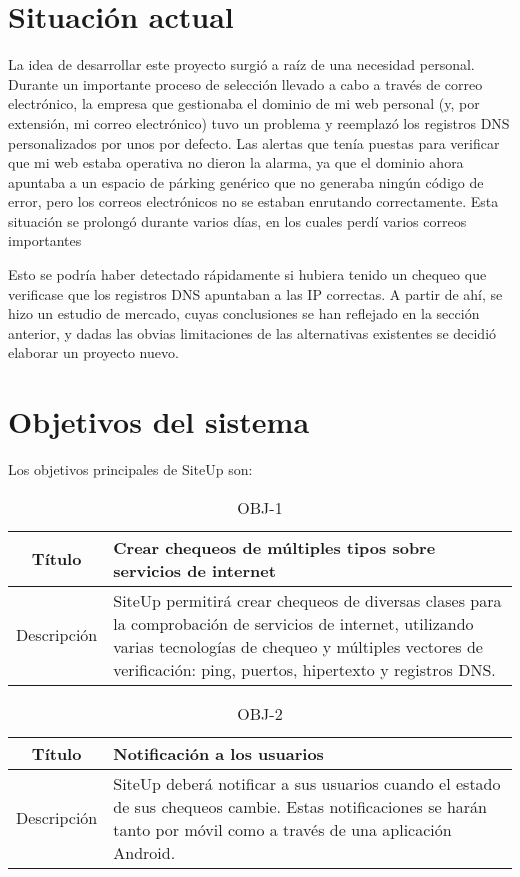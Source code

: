 \section{Situación actual}

La idea de desarrollar este proyecto surgió a raíz de una necesidad
personal. Durante un importante proceso de selección llevado a cabo a través de
correo electrónico, la empresa que gestionaba el dominio de mi web personal (y,
por extensión, mi correo electrónico) tuvo un problema y reemplazó los registros
DNS personalizados por unos por defecto. Las alertas que tenía puestas para
verificar que mi web estaba operativa no dieron la alarma, ya que el dominio
ahora apuntaba a un espacio de párking genérico que no generaba ningún código de
error, pero los correos electrónicos no se estaban enrutando correctamente. Esta
situación se prolongó durante varios días, en los cuales perdí varios correos
importantes

Esto se podría haber detectado rápidamente si hubiera tenido un chequeo que
verificase que los registros DNS apuntaban a las IP correctas. A partir de ahí,
se hizo un estudio de mercado, cuyas conclusiones se han reflejado en la sección
anterior, y dadas las obvias limitaciones de las alternativas existentes se
decidió elaborar un proyecto nuevo.

\section{Objetivos del sistema}

Los objetivos principales de SiteUp son:

\begin{table}[h!]
  \centering
  \begin{tabularx}{\textwidth}{|c|X|}
    \hline
    Título & Crear chequeos de múltiples tipos sobre servicios de internet \\

    \hline

    Descripción & SiteUp permitirá crear chequeos de diversas clases para la
    comprobación de servicios de internet, utilizando varias tecnologías de
    chequeo y múltiples vectores de verificación: ping, puertos, hipertexto y
    registros DNS. \\    

    \hline
  \end{tabularx}
  \caption{OBJ-1}
\end{table}


\begin{table}[h!]
  \centering
  \begin{tabularx}{\textwidth}{|c|X|}
    \hline
    Título & Notificación a los usuarios \\

    \hline

    Descripción & SiteUp deberá notificar a sus usuarios cuando el estado de sus
    chequeos cambie. Estas notificaciones se harán tanto por móvil como a través
    de una aplicación Android. \\

    \hline
  \end{tabularx}
  \caption{OBJ-2}
\end{table}

